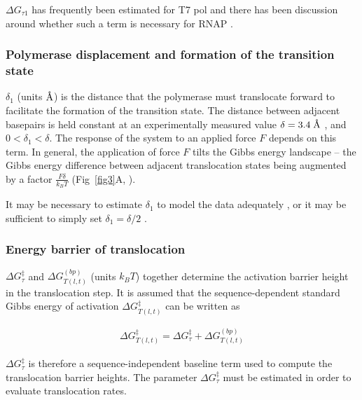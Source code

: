 \documentclass[10pt,letterpaper]{article}
\newcommand{\angstrom}{\mbox{\normalfont\AA}}
\begin{document}
$\Delta G_{\tau 1}$ has frequently been estimated for T7 pol \cite{yin2004structural, yu2012small, thomen2005unravelling} and there has been discussion around whether such a term is necessary for RNAP \cite{bai2007mechanochemical}. \\

\subsubsection*{Polymerase displacement and formation of the transition state}
$\delta_1$ (units $\angstrom$) is the distance that the polymerase must translocate forward to facilitate the formation of the transition state. The distance between adjacent basepairs is held constant at an experimentally measured value $\delta = 3.4\; \angstrom$ \cite{watson1953molecular}, and   $0 <\delta_1 < \delta$. The response of the system to an applied force $F$ depends on this term. In general, the application of force $F$ tilts the Gibbs energy landscape -- the Gibbs energy difference between adjacent translocation states being augmented by a factor $\frac{F\delta}{k_BT}$ (Fig~\ref{fig3}A, \cite{depken2009origin, herbert2008single}).



It may be necessary to estimate $\delta_1$ to model the data adequately \cite{maoileidigh2011unified}, or it may be sufficient to simply set $\delta_1 = \delta / 2$ \cite{depken2009origin}. \\


\subsubsection*{Energy barrier of translocation}


$\Delta G^\ddag_{\tau}$ and $\Delta G_{T(l,t)}^{(bp)}$ (units $k_BT$) together determine the activation barrier height in the translocation step. It is assumed that the sequence-dependent standard Gibbs energy of activation $\Delta G_{T(l,t)}^{\ddag}$ can be written as



\begin{eqnarray}
\label{eq:translocationBarrier}
    \Delta G_{T(l,t)}^{\ddag} = \Delta G^\ddag_{\tau} + \Delta G_{T(l,t)}^{(bp)}
\end{eqnarray}



$\Delta G^\ddag_{\tau}$ is therefore a sequence-independent baseline term used to compute the translocation barrier heights.  The parameter $\Delta G^\ddag_{\tau}$ must be estimated in order to evaluate translocation rates.
\end{document}
